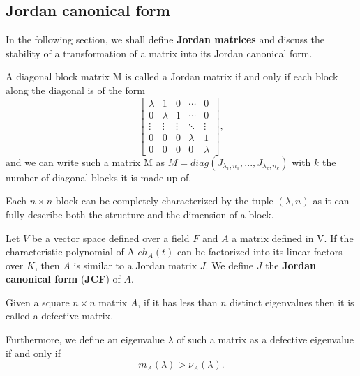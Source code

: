 \subsection*{Jordan canonical form}
In the following section, we shall define \textbf{Jordan matrices} and discuss the stability of a transformation of a matrix
into its Jordan canonical form.
\begin{definition}
    A diagonal block matrix M is called a Jordan matrix if and only if each block along the diagonal is of the form
    \[
        \begin{bmatrix}
            \lambda     &    1         &    0     &   \cdots   &    0    \\
                0       &    \lambda   &    1     &   \cdots   &    0    \\
            \vdots      &    \vdots    &  \vdots  &   \ddots   & \vdots  \\
                0       &       0      &     0    &  \lambda   &    1    \\
                0       &       0      &     0    &     0      & \lambda
        \end{bmatrix},
    \]
    and we can write such a matrix M as
    \(M = diag(J_{\lambda_{1}, n_{1}}, ..., J_{\lambda_{k}, n_{k}})\) with \(k\) the number of diagonal blocks it is made up of.

    Each \(n \times n\) block can be completely characterized by the tuple \((\lambda, n)\) as it can fully describe both
    the structure and the dimension of a block.
\end{definition}

\begin{remark}
    Let \(V\) be a vector space defined over a field \(F\) and \(A\) a matrix defined in V. If the characteristic
    polynomial of A \(ch_{A}(t)\) can be factorized into its linear factors over \(K\), then \(A\) is similar to a
    Jordan matrix \(J\). We define \(J\) the \textbf{Jordan canonical form} (\textbf{JCF}) of \(A\).
\end{remark}

\begin{definition}
    Given a square \(n \times n\) matrix \(A\), if it has less than \(n\) distinct eigenvalues then it is called a
    defective matrix.

    Furthermore, we define an eigenvalue \(\lambda\) of such a matrix as a defective eigenvalue if and only if
    \[
        m_{A}(\lambda) > \nu_{A}(\lambda).
    \]
\end{definition}

